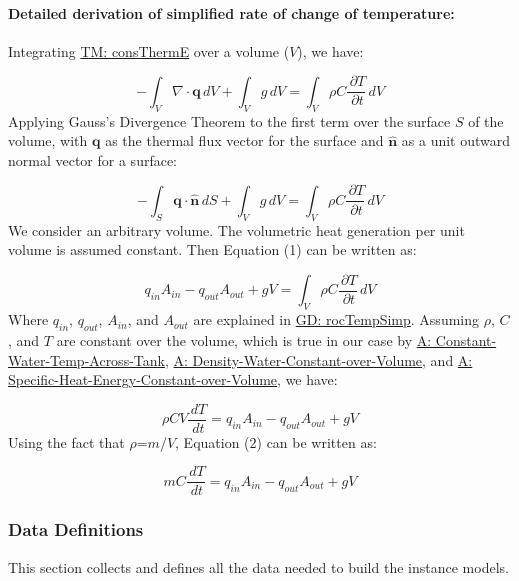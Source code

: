 \documentclass[12pt]{article}
\begin{document}
\paragraph{Detailed derivation of simplified rate of change of temperature:}
\label{GD:rocTempSimpDeriv}
Integrating \hyperref[TM:consThermE]{TM: consThermE} over a volume ($V$), we have:

\begin{displaymath}
-\int_{V}{∇\cdot{}\mathbf{q}}\,dV+\int_{V}{g}\,dV=\int_{V}{ρ C \frac{\,\partial{}T}{\,\partial{}t}}\,dV
\end{displaymath}
Applying Gauss's Divergence Theorem to the first term over the surface $S$ of the volume, with $\mathbf{q}$ as the thermal flux vector for the surface and $\mathbf{\hat{n}}$ as a unit outward normal vector for a surface:

\begin{displaymath}
-\int_{S}{\mathbf{q}\cdot{}\mathbf{\hat{n}}}\,dS+\int_{V}{g}\,dV=\int_{V}{ρ C \frac{\,\partial{}T}{\,\partial{}t}}\,dV
\end{displaymath}
We consider an arbitrary volume. The volumetric heat generation per unit volume is assumed constant. Then Equation (1) can be written as:

\begin{displaymath}
{q_{in}} {A_{in}}-{q_{out}} {A_{out}}+g V=\int_{V}{ρ C \frac{\,\partial{}T}{\,\partial{}t}}\,dV
\end{displaymath}
Where ${q_{in}}$, ${q_{out}}$, ${A_{in}}$, and ${A_{out}}$ are explained in \hyperref[GD:rocTempSimp]{GD: rocTempSimp}. Assuming $ρ$, $C$, and $T$ are constant over the volume, which is true in our case by \hyperref[assumpCWTAT]{A: Constant-Water-Temp-Across-Tank}, \hyperref[assumpDWCoW]{A: Density-Water-Constant-over-Volume}, and \hyperref[assumpSHECoW]{A: Specific-Heat-Energy-Constant-over-Volume}, we have:

\begin{displaymath}
ρ C V \frac{\,dT}{\,dt}={q_{in}} {A_{in}}-{q_{out}} {A_{out}}+g V
\end{displaymath}
Using the fact that $ρ$=$m$/$V$, Equation (2) can be written as:

\begin{displaymath}
m C \frac{\,dT}{\,dt}={q_{in}} {A_{in}}-{q_{out}} {A_{out}}+g V
\end{displaymath}
\subsubsection{Data Definitions}
\label{Sec:DDs}
This section collects and defines all the data needed to build the instance models.
\end{document}
